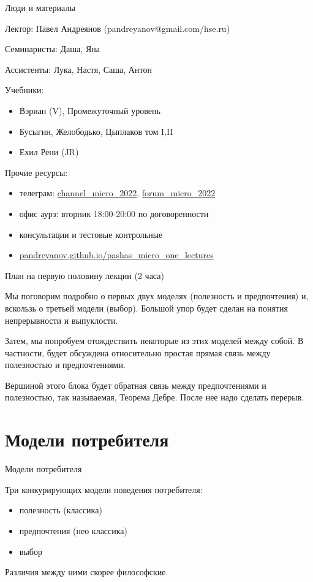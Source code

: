 \documentclass{beamer}
\begin{document}
\begin{frame}{Люди и материалы}

Лектор: Павел Андреянов (pandreyanov@gmail.com/hse.ru)

Семинаристы: Даша, Яна

Ассистенты: Лука, Настя, Саша, Антон

Учебники:
\begin{itemize}
\item Вэриан (V), Промежуточный уровень
\item Бусыгин, Желободько, Цыплаков том I,II
\item Ехил Рени (JR)
\end{itemize}

Прочие ресурсы:
\begin{itemize}
\item телеграм: \url{channel_micro_2022}, \url{forum_micro_2022}
\item офис аурз: вторник 18:00-20:00 по договоренности
\item консультации и тестовые контрольные
\item \url{pandreyanov.github.io/pashas_micro_one_lectures}
\end{itemize}

\end{frame}

\begin{frame}{План на первую половину лекции (2 часа)}

Мы поговорим подробно о первых двух моделях (полезность и предпочтения) и, вскользь о третьей модели (выбор). Большой упор будет сделан на понятия непрерывности и выпуклости.

Затем, мы попробуем отождествить некоторые из этих моделей между собой. В частности, будет обсуждена относительно простая прямая связь между полезностью и предпочтениями.

Вершиной этого блока будет обратная связь между предпочтениями и полезностью, так называемая, Теорема Дебре. После нее надо сделать перерыв.

\end{frame}

\section{Модели потребителя}

\begin{frame}{Модели потребителя}

Три конкурирующих модели поведения потребителя:

\begin{itemize}
\item полезность (классика)
\item предпочтения (нео классика)
\item выбор
\end{itemize}

Различия между ними скорее философские.

\end{frame}
\end{document}
